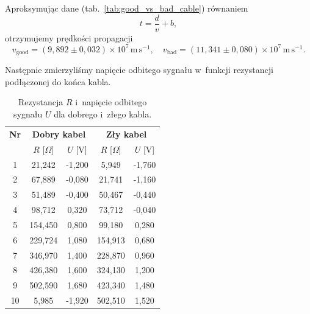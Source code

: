 \documentclass[12pt]{article}
\begin{document}
Aproksymując dane (tab.~\ref{tab:good_vs_bad_cable}) równaniem
\[
  t = \frac{d}{v} + b,
\]
otrzymujemy prędkości propagacji
\[
  v_{\mathrm{good}}=(9{,}892\pm0{,}032)\times10^{7}\,\mathrm{m\,s^{-1}},\quad
  v_{\mathrm{bad}}=(11{,}341\pm0{,}080)\times10^{7}\,\mathrm{m\,s^{-1}}.
\]

Następnie zmierzyliśmy napięcie odbitego sygnału w~funkcji rezystancji podłączonej do końca kabla.

\begin{table}[H]
  \centering
  \begin{tabular}{c|cc|cc}
    \toprule
    \textbf{Nr} & \multicolumn{2}{c|}{\textbf{Dobry kabel}} & \multicolumn{2}{c}{\textbf{Zły kabel}} \\
                & $R$ [$\Omega$] & $U$ [V] & $R$ [$\Omega$] & $U$ [V] \\
    \midrule
    1  &  21{,}242 & -1{,}200 &   5{,}949 & -1{,}760 \\
    2  &  67{,}889 & -0{,}080 &  21{,}741 & -1{,}160 \\
    3  &  51{,}489 & -0{,}400 &  50{,}467 & -0{,}440 \\
    4  &  98{,}712 &  0{,}320 &  73{,}712 & -0{,}040 \\
    5  & 154{,}450 &  0{,}800 &  99{,}180 &  0{,}280 \\
    6  & 229{,}724 &  1{,}080 & 154{,}913 &  0{,}680 \\
    7  & 346{,}970 &  1{,}400 & 228{,}870 &  0{,}960 \\
    8  & 426{,}380 &  1{,}600 & 324{,}130 &  1{,}200 \\
    9  & 502{,}590 &  1{,}680 & 423{,}340 &  1{,}480 \\
    10 &   5{,}985 & -1{,}920 & 502{,}510 &  1{,}520 \\
    \bottomrule
  \end{tabular}
  \caption{Rezystancja $R$ i~napięcie odbitego sygnału $U$ dla dobrego i~złego kabla.}
  \label{tab:good_vs_bad_cable_voltage}
\end{table}
\end{document}

